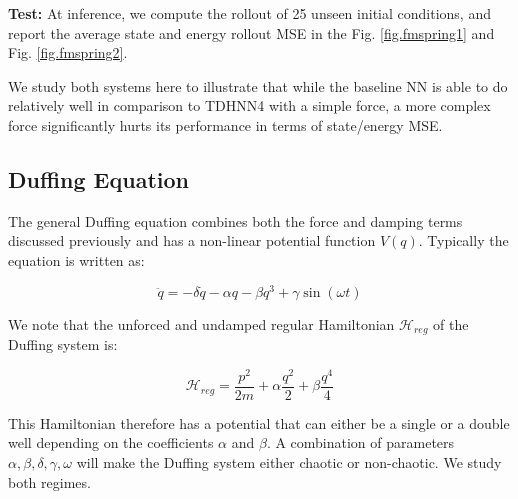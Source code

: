 \documentclass{article}
\begin{document}
\textbf{Test:} At inference, we compute the rollout of 25 unseen initial conditions, and report the average state and energy rollout MSE in the Fig. \ref{fig.fmspring1} and Fig. \ref{fig.fmspring2}.

We study both systems here to illustrate that while the baseline NN is able to do relatively well in comparison to TDHNN4 with a simple force, a more complex force significantly hurts its performance in terms of state/energy MSE.

\subsection{Duffing Equation}

The general Duffing equation combines both the force and damping terms discussed previously and has a non-linear potential function $V(q)$. Typically the equation is written as:

\begin{equation}
\ddot{q} = -\delta \dot{q} -\alpha q -\beta q^3 +\gamma \sin(\omega t) 
\end{equation}

We note that the unforced and undamped regular Hamiltonian $\mathcal{H}_{reg}$ of the Duffing system is:

\begin{equation}
\mathcal{H}_{reg} = \frac{p^2}{2m}+ \alpha \frac{q^2}{2} + \beta \frac{q^4}{4}
\end{equation}

This Hamiltonian therefore has a potential that can either be a single or a double well depending on the coefficients $\alpha$ and $\beta$. A combination of parameters $\alpha,\beta,\delta,\gamma,\omega$ will make the Duffing system either chaotic or non-chaotic. We study both regimes.
\end{document}
